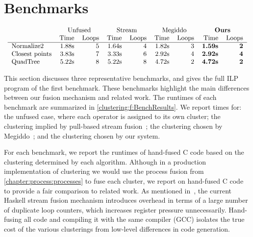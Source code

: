 \section{Benchmarks}
\label{clustering:s:Benchmarks}

\begin{table}
$$\begin{array}{c}

\begin{tabular}{lrrrrrrrr}
                & \multicolumn{2}{c}{Unfused}         & \multicolumn{2}{c}{Stream}
                & \multicolumn{2}{c}{Megiddo} &\multicolumn{2}{c}{\textbf{Ours}} \\
                & Time & Loops   & Time & Loops      & Time & Loops & Time & Loops   \\
\hline
Normalize2      & 1.88s & 5      & 1.64s & 4          & 1.82s & 3  & \textbf{1.59s} & \textbf{2}\\
Closest points  & 3.83s & 7      & 3.33s & 6          & 2.92s & 4  & \textbf{2.92s} & \textbf{4}\\
QuadTree        & 5.22s & 8      & 5.22s & 8          & 4.72s & 2  & \textbf{4.72s} & \textbf{2}\\
\end{tabular}

\end{array}$$
\caption{Benchmark results}
\label{clustering:f:BenchResults}
\end{table}

This section discusses three representative benchmarks, and gives the full ILP program of the first benchmark.
These benchmarks highlight the main differences between our fusion mechanism and related work.
The runtimes of each benchmark are summarized in \cref{clustering:f:BenchResults}.
We report times for: the unfused case, where each operator is assigned to its own cluster; the clustering implied by pull-based stream fusion~\cite{coutts2007stream}; the clustering chosen by Megiddo~\cite{megiddo1998optimal}; and the clustering chosen by our system. 

For each benchmark, we report the runtimes of hand-fused C code based on the clustering determined by each algorithm.
Although in a production implementation of clustering we would use the process fusion from \cref{chapter:process:processes} to fuse each cluster, we report on hand-fused C code to provide a fair comparison to related work.
As mentioned in~\citet{lippmeier2013data}, the current Haskell stream fusion mechanism introduces overhead in terms of a large number of duplicate loop counters, which increases register pressure unnecessarily.
Hand-fusing all code and compiling it with the same compiler (GCC) isolates the true cost of the various clusterings from low-level differences in code generation.


